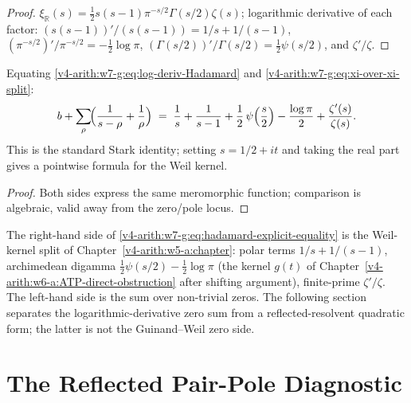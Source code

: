 \begin{proof}
\(\xi_{\mathbb{R}}(s)=\tfrac{1}{2}s(s-1)\pi^{-s/2}\Gamma(s/2)\zeta(s)\);
logarithmic derivative of each factor:
\((s(s-1))'/(s(s-1))=1/s+1/(s-1)\),
\((\pi^{-s/2})'/\pi^{-s/2}=-\tfrac{1}{2}\log\pi\),
\((\Gamma(s/2))'/\Gamma(s/2)=\tfrac{1}{2}\psi(s/2)\), and
\(\zeta'/\zeta\).
\end{proof}

\begin{corollary}
\label{v4-arith:w7-g:cor:hadamard-equals-explicit}
Equating \eqref{v4-arith:w7-g:eq:log-deriv-Hadamard}
and \eqref{v4-arith:w7-g:eq:xi-over-xi-split}:
\begin{equation}
\label{v4-arith:w7-g:eq:hadamard-explicit-equality}
b+\sum_{\rho}\!\Bigl(\frac{1}{s-\rho}+\frac{1}{\rho}\Bigr)
\;=\;\frac{1}{s}+\frac{1}{s-1}+\frac{1}{2}\,\psi\!\left(\frac{s}{2}\right)-\frac{\log\pi}{2}+\frac{\zeta'(s)}{\zeta(s)}.
\end{equation}
This is the standard Stark identity; setting \(s=1/2+it\) and taking
the real part gives a pointwise formula for the Weil kernel.
\end{corollary}

\begin{proof}
Both sides express the same meromorphic function; comparison is
algebraic, valid away from the zero/pole locus.
\end{proof}

\begin{remark}
\label{v4-arith:w7-g:rem:chapter-split}
The right-hand side of
\eqref{v4-arith:w7-g:eq:hadamard-explicit-equality} is the Weil-kernel
split of Chapter~\ref{v4-arith:w5-a:chapter}: polar terms
\(1/s+1/(s-1)\), archimedean digamma \(\tfrac{1}{2}\psi(s/2)-\tfrac{1}{2}\log\pi\)
(the kernel \(g(t)\) of Chapter~\ref{v4-arith:w6-a:ATP-direct-obstruction} after shifting argument), finite-prime
\(\zeta'/\zeta\). The left-hand side is the sum over non-trivial zeros.
The following section separates the logarithmic-derivative zero sum
from a reflected-resolvent quadratic form; the latter is not the
Guinand--Weil zero side.
\end{remark}

\section{The Reflected Pair-Pole Diagnostic}
\label{v4-arith:w7-g:pair-pole}

